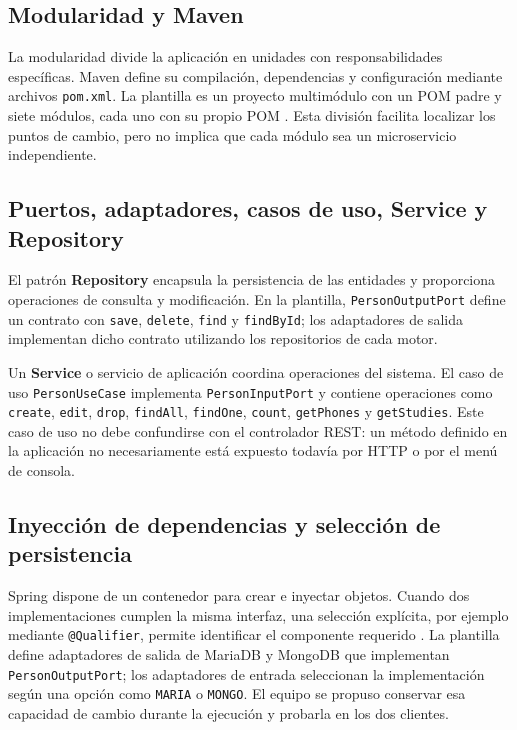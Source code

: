 \documentclass[11pt,a4paper]{article}
\begin{document}
\subsection{Modularidad y Maven}
La modularidad divide la aplicación en unidades con responsabilidades específicas.
Maven define su compilación, dependencias y configuración mediante archivos
\texttt{pom.xml}. La plantilla es un proyecto multimódulo con un POM padre y
siete módulos, cada uno con su propio POM \cite{maven,plantilla}. Esta división
facilita localizar los puntos de cambio, pero no implica que cada módulo sea
un microservicio independiente.

\subsection{Puertos, adaptadores, casos de uso, Service y Repository}
El patrón \textbf{Repository} encapsula la persistencia de las entidades y
proporciona operaciones de consulta y modificación. En la plantilla,
\texttt{PersonOutputPort} define un contrato con \texttt{save},
\texttt{delete}, \texttt{find} y \texttt{findById}; los adaptadores de salida
implementan dicho contrato utilizando los repositorios de cada motor.

Un \textbf{Service} o servicio de aplicación coordina operaciones del sistema.
El caso de uso \texttt{PersonUseCase} implementa \texttt{PersonInputPort} y
contiene operaciones como \texttt{create}, \texttt{edit}, \texttt{drop},
\texttt{findAll}, \texttt{findOne}, \texttt{count}, \texttt{getPhones} y
\texttt{getStudies}. Este caso de uso no debe confundirse con el controlador REST:
un método definido en la aplicación no necesariamente está expuesto todavía
por HTTP o por el menú de consola.

\subsection{Inyección de dependencias y selección de persistencia}
Spring dispone de un contenedor para crear e inyectar objetos. Cuando dos
implementaciones cumplen la misma interfaz, una selección explícita, por
ejemplo mediante \texttt{@Qualifier}, permite identificar el componente
requerido \cite{spring}. La plantilla define adaptadores de salida de MariaDB
y MongoDB que implementan \texttt{PersonOutputPort}; los adaptadores de entrada
seleccionan la implementación según una opción como \texttt{MARIA} o
\texttt{MONGO}. El equipo se propuso conservar esa capacidad de cambio durante
la ejecución y probarla en los dos clientes.
\end{document}
